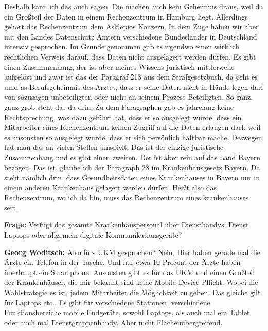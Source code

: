 Deshalb kann ich das auch sagen. Die machen auch kein Geheimnis draus, weil da ein Großteil der Daten in einem Rechenzentrum in Hamburg liegt. Allerdings gehört das Rechenzentrum dem Asklepios Konzern. In dem Zuge haben wir aber mit den Landes Datenschutz Ämtern verschiedene Bundesländer in Deutschland intensiv gesprochen. Im Grunde genommen gab es irgendwo einen wirklich rechtlichen Verweis darauf, dass Daten nicht ausgelagert werden dürfen. Es gibt einen Zusammenhang, der ist aber meines Wissens juristisch mittlerweile aufgelöst und zwar ist das der Paragraf 213 aus dem Strafgesetzbuch, da geht es umd as Berufsgeheimnis des Arztes, dass er seine Daten nicht in Hände legen darf von sozusagen unbeteiligten oder nicht an seinem Prozess Beteiligten. So ganz, ganz grob steht das da drin. Zu dem Paragraphen gab es jahrelang keine Rechtsprechung, was dazu geführt hat, dass er so ausgelegt wurde, dass ein Mitarbeiter eines Rechenzentrum keinen Zugriff auf die Daten erlangen darf, weil es ansonsten so ausgelegt wurde, dass er sich persönlich haftbar mache. Deswegen hat man das an vielen Stellen umspielt. Das ist der einzige juristische Zusammenhang und es gibt einen zweiten. Der ist aber rein auf das Land Bayern bezogen. Das ist, glaube ich der Paragraph 28 im Krankenhausgesetz Bayern. Da steht nämlich drin, dass Gesundheitsdaten eines Krankenhauses in Bayern nur in einem anderen Krankenhaus gelagert werden dürfen. Heißt also das Rechenzentrum, wo ich da bin, muss das Rechenzentrum eines krankenhauses sein.

\textbf{Frage: } Verfügt das gesamte Krankenhauspersonal über Diensthandys,  Dienst Laptops oder allgemein digitale Kommunikationsgeräte?

\textbf{Georg Woditsch: } Also fürs UKM gesprochen? Nein. Hier haben gerade mal die Ärzte ein Telefon in der Tasche. Und nur etwa 10 Prozent der Ärzte haben überhaupt ein Smartphone.
Ansonsten gibt es für das UKM und einen Großteil der Krankenhäuser, die mir bekannt sind keine Mobile Device Pflicht. Wobei die Wahlstrategie es ist, jedem Mitarbeiter die Möglichkeit zu geben. Das gleiche gilt für Laptops etc.. Es gibt für verschiedene Stationen, verschiedene Funktionsbereiche mobile Endgeräte, sowohl Laptops, als auch mal ein Tablet oder auch mal Dienstgruppenhandy. Aber nicht Flächenübergreifend.

